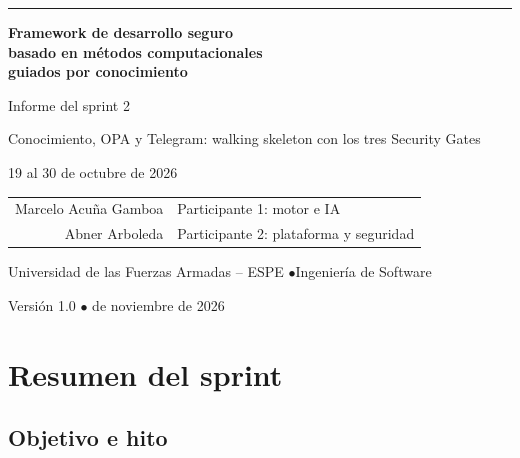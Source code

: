 \documentclass[11pt,a4paper]{report}
\begin{document}
\begin{titlepage}
\centering
\vspace*{4.2cm}
{\color{azulfw}\rule{\textwidth}{0.8pt}}\par\vspace{0.9cm}
{\fontsize{24}{30}\selectfont\bfseries Framework de desarrollo seguro\\
basado en métodos computacionales\\ guiados por conocimiento\par}
\vspace{0.9cm}{\color{azulfw}\rule{\textwidth}{0.8pt}}\par
\vspace{1.1cm}
{\Large Informe del sprint 2\par}
\vspace{0.3cm}
{\large Conocimiento, OPA y Telegram: walking skeleton con los tres Security Gates\par}
\vspace{0.3cm}
{\normalsize 19 al 30 de octubre de 2026\par}
\vspace{2.2cm}
{\normalsize
\begin{tabular}{rl}
Marcelo Acuña Gamboa & Participante 1: motor e IA\\
Abner Arboleda & Participante 2: plataforma y seguridad\\
\end{tabular}\par}
\vfill
{\normalsize Universidad de las Fuerzas Armadas – ESPE \quad$\bullet$\quad Ingeniería de Software\par}
\vspace{0.4cm}
{\normalsize Versión 1.0 \quad$\bullet$ de noviembre de 2026\par}
\end{titlepage}

\tableofcontents

\chapter{Resumen del sprint}

\section{Objetivo e hito}
\end{document}
